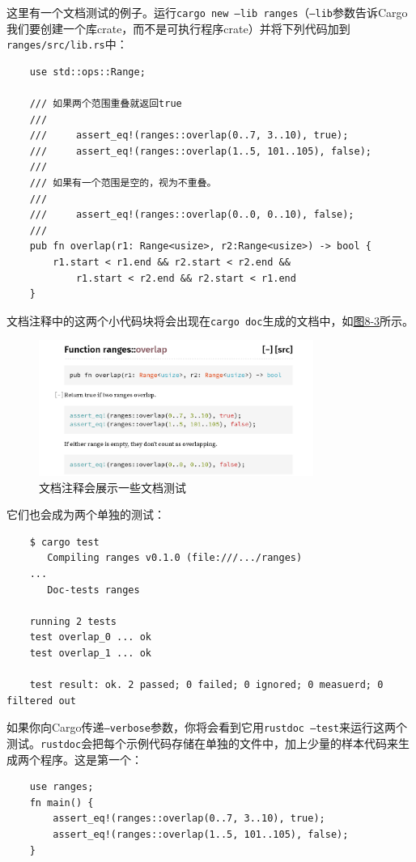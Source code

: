 这里有一个文档测试的例子。运行\texttt{cargo new --lib ranges}（\texttt{--lib}参数告诉Cargo我们要创建一个库crate，而不是可执行程序crate）并将下列代码加到\texttt{ranges/src/lib.rs}中：
\begin{verbatim}
    use std::ops::Range;

    /// 如果两个范围重叠就返回true
    ///
    ///     assert_eq!(ranges::overlap(0..7, 3..10), true);
    ///     assert_eq!(ranges::overlap(1..5, 101..105), false);
    ///
    /// 如果有一个范围是空的，视为不重叠。
    ///
    ///     assert_eq!(ranges::overlap(0..0, 0..10), false);
    ///
    pub fn overlap(r1: Range<usize>, r2:Range<usize>) -> bool {
        r1.start < r1.end && r2.start < r2.end &&
            r1.start < r2.end && r2.start < r1.end
    }
\end{verbatim}

文档注释中的这两个小代码块将会出现在\texttt{cargo doc}生成的文档中，如\hyperref[f8-3]{图8-3}所示。

\begin{figure}[htbp]
    \centering
    \includegraphics[width=0.8\textwidth]{../img/f8-3.png}
    \caption{文档注释会展示一些文档测试}
    \label{f8-3}
\end{figure}

它们也会成为两个单独的测试：
\begin{verbatim}
    $ cargo test
       Compiling ranges v0.1.0 (file:///.../ranges)
    ...
       Doc-tests ranges

    running 2 tests
    test overlap_0 ... ok
    test overlap_1 ... ok

    test result: ok. 2 passed; 0 failed; 0 ignored; 0 measuerd; 0 filtered out
\end{verbatim}

如果你向Cargo传递\texttt{--verbose}参数，你将会看到它用\texttt{rustdoc --test}来运行这两个测试。\texttt{rustdoc}会把每个示例代码存储在单独的文件中，加上少量的样本代码来生成两个程序。这是第一个：
\begin{verbatim}
    use ranges;
    fn main() {
        assert_eq!(ranges::overlap(0..7, 3..10), true);
        assert_eq!(ranges::overlap(1..5, 101..105), false);
    }
\end{verbatim}

